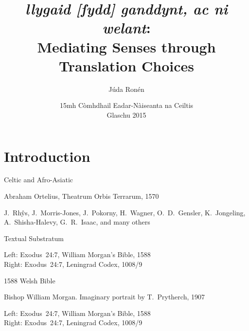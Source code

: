 



\title
[Mediating Senses through Translation Choices]
{\emph{llygaid [ſydd] ganddynt, ac ni welant}:\\
Mediating Senses through Translation Choices}
\author[]{Júda Ronén}
\date{15mh Còmhdhail Eadar-Nàiseanta na Ceiltis\\Glaschu 2015}

\frame{\titlepage}


\setcounter{section}{-1}
\section{Introduction}


\begin{frame}{Celtic and Afro-Asiatic}
	\begin{center}

		{\scriptsize
		Abraham Ortelius, Theatrum Orbis Terrarum, 1570
		}
	\end{center}

	J.\ Rhŷs,
	J.\ Morris-Jones,
	J.\ Pokorny,
	H.\ Wagner,
	O.\ D.\ Gensler,
	K.\ Jongeling,
	A.\ Shisha-Halevy,
	G.\ R.\ Isaac,
	and many others
\end{frame}



\begin{frame}{Textual Substratum}
	\hfill

	{\scriptsize
	Left: Exodus~24:7, William Morgan's Bible, 1588\\
	Right: Exodus~24:7, Leningrad Codex, 1008/9
	}
\end{frame}



\begin{frame}{1588 Welsh Bible}
	\begin{center}

		{\scriptsize Bishop William Morgan. Imaginary portrait by T.\ Prytherch, 1907}
	\end{center}

	\vfill

	\hfill

	{
	\scriptsize
	Left: Exodus~24:7, William Morgan's Bible, 1588\\
	Right: Exodus~24:7, Leningrad Codex, 1008/9
	}
\end{frame}




